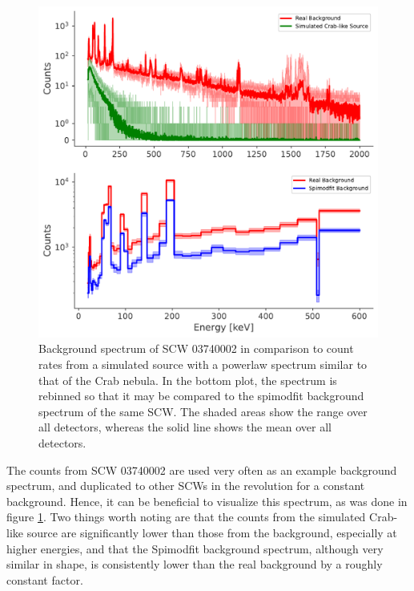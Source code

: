 \documentclass{article}
\begin{document}
\begin{figure}[h]
    \includegraphics[width=\textwidth]{Images/background.pdf}
    \caption{Background spectrum of SCW 03740002 in comparison to count rates from a simulated source with a powerlaw spectrum similar to that of the Crab nebula. In the bottom plot, the spectrum is rebinned so that it may be compared to the spimodfit background spectrum of the same SCW. The shaded areas show the range over all detectors, whereas the solid line shows the mean over all detectors.}
    \label{plt bkg spec}
\end{figure}

The counts from SCW 03740002 are used very often as an example background spectrum, and duplicated to other SCWs in the revolution for a constant background. Hence, it can be beneficial to visualize this spectrum, as was done in figure \ref{plt bkg spec}. Two things worth noting are that the counts from the simulated Crab-like source are significantly lower than those from the background, especially at higher energies, and that the Spimodfit background spectrum, although very similar in shape, is consistently lower than the real background by a roughly constant factor.
\end{document}
